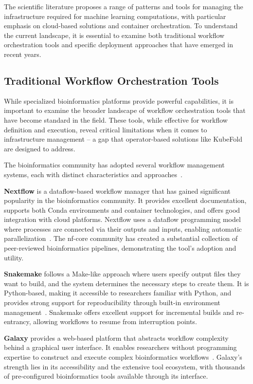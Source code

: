 The scientific literature proposes a range of patterns and tools for managing the infrastructure required for machine learning computations, with particular emphasis on cloud-based solutions and container orchestration.
To understand the current landscape, it is essential to examine both traditional workflow orchestration tools and specific deployment approaches that have emerged in recent years.

\subsection{Traditional Workflow Orchestration Tools}

While specialized bioinformatics platforms provide powerful capabilities, it is important to examine the broader landscape of workflow orchestration tools that have become standard in the field.
These tools, while effective for workflow definition and execution, reveal critical limitations when it comes to infrastructure management -- a gap that operator-based solutions like KubeFold are designed to address.

The bioinformatics community has adopted several workflow management systems, each with distinct characteristics and approaches~\cite{workflows_review_nature}.

\textbf{Nextflow} is a dataflow-based workflow manager that has gained significant popularity in the bioinformatics community.
It provides excellent documentation, supports both Conda environments and container technologies, and offers good integration with cloud platforms.
Nextflow uses a dataflow programming model where processes are connected via their outputs and inputs, enabling automatic parallelization~\cite{nextflow}.
The nf-core community has created a substantial collection of peer-reviewed bioinformatics pipelines, demonstrating the tool's adoption and utility.

\textbf{Snakemake} follows a Make-like approach where users specify output files they want to build, and the system determines the necessary steps to create them.
It is Python-based, making it accessible to researchers familiar with Python, and provides strong support for reproducibility through built-in environment management~\cite{snakemake}.
Snakemake offers excellent support for incremental builds and re-entrancy, allowing workflows to resume from interruption points.

\textbf{Galaxy} provides a web-based platform that abstracts workflow complexity behind a graphical user interface.
It enables researchers without programming expertise to construct and execute complex bioinformatics workflows~\cite{galaxy}.
Galaxy's strength lies in its accessibility and the extensive tool ecosystem, with thousands of pre-configured bioinformatics tools available through its interface.

